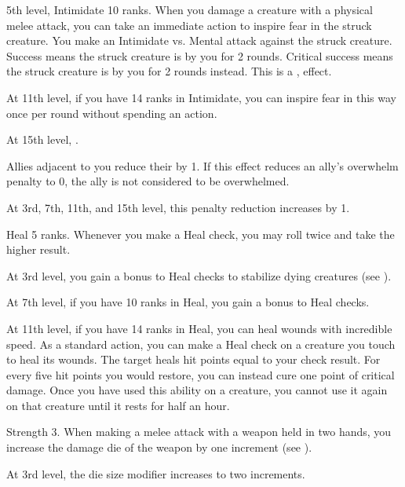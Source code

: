     \featpres 5th level, Intimidate 10 ranks.
    \featben When you damage a creature with a physical melee attack, you can take an immediate action to inspire fear in the struck creature.
    You make an Intimidate vs. Mental attack against the struck creature.
    Success means the struck creature is \shaken by you for 2 rounds.
    Critical success means the struck creature is \frightened by you for 2 rounds instead.
    This is a ,  effect.

    At 11th level, if you have 14 ranks in Intimidate, you can inspire fear in this way once per round without spending an action.

    At 15th level, \tdash.

    \featben Allies adjacent to you reduce their  by 1.
    If this effect reduces an ally's overwhelm penalty to 0, the ally is not considered to be overwhelmed.

    At 3rd, 7th, 11th, and 15th level, this penalty reduction increases by 1.

    \featpre Heal 5 ranks.
    \featben Whenever you make a Heal check, you may roll twice and take the higher result.

    At 3rd level, you gain a  bonus to Heal checks to stabilize dying creatures (see ).

    At 7th level, if you have 10 ranks in Heal, you gain a  bonus to Heal checks.

    At 11th level, if you have 14 ranks in Heal, you can heal wounds with incredible speed.
    As a standard action, you can make a Heal check on a creature you touch to heal its wounds.
    The target heals hit points equal to your check result.
    For every five hit points you would restore, you can instead cure one point of critical damage.
    Once you have used this ability on a creature, you cannot use it again on that creature until it rests for half an hour.

    \featpre Strength 3.
    \featben When making a melee attack with a weapon held in two hands, you increase the damage die of the weapon by one increment (see ).

    At 3rd level, the die size modifier increases to two increments.

